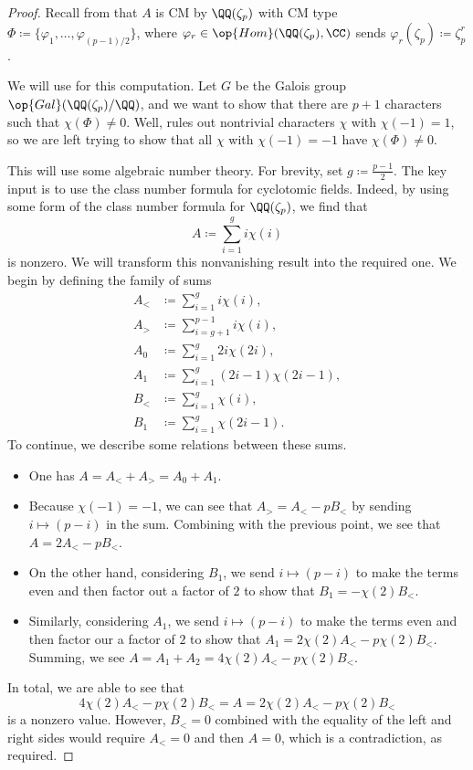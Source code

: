\documentclass{article}
\begin{document}
\begin{proof}
	Recall from  that $A$ is CM by $\QQ(\zeta_p)$ with CM type $\Phi\coloneqq\{\varphi_1,\ldots,\varphi_{(p-1)/2}\}$, where $\varphi_r\in\op{Hom}(\QQ(\zeta_p),\CC)$ sends $\varphi_r(\zeta_p)\coloneqq\zeta_p^r$.
	
	We will use  for this computation. Let $G$ be the Galois group $\op{Gal}(\QQ(\zeta_p)/\QQ)$, and we want to show that there are $p+1$ characters such that $\chi(\Phi)\ne0$. Well,  rules out nontrivial characters $\chi$ with $\chi(-1)=1$, so we are left trying to show that all $\chi$ with $\chi(-1)=-1$ have $\chi(\Phi)\ne0$.

	This will use some algebraic number theory. For brevity, set $g\coloneqq\frac{p-1}2$. The key input is to use the class number formula for cyclotomic fields. Indeed, by using some form of the class number formula for $\QQ(\zeta_p)$, we find that
	\[A\coloneqq\sum_{i=1}^gi\chi(i)\]
	is nonzero. We will transform this nonvanishing result into the required one. We begin by defining the family of sums
	\begin{align*}
		A_< &\coloneqq \sum_{i=1}^gi\chi(i), \\
		A_> &\coloneqq \sum_{i=g+1}^{p-1}i\chi(i), \\
		A_0 &\coloneqq \sum_{i=1}^g2i\chi(2i), \\
		A_1 &\coloneqq \sum_{i=1}^g(2i-1)\chi(2i-1), \\
		B_< &\coloneqq \sum_{i=1}^g\chi(i), \\
		B_1 &\coloneqq \sum_{i=1}^g\chi(2i-1).
	\end{align*}
	To continue, we describe some relations between these sums.
	\begin{itemize}
		\item One has $A=A_<+A_>=A_0+A_1$.
		\item Because $\chi(-1)=-1$, we can see that $A_>=A_<-pB_<$ by sending $i\mapsto(p-i)$ in the sum. Combining with the previous point, we see that $A=2A_<-pB_<$.
		\item On the other hand, considering $B_1$, we send $i\mapsto(p-i)$ to make the terms even and then factor out a factor of $2$ to show that $B_1=-\chi(2)B_<$.
		\item Similarly, considering $A_1$, we send $i\mapsto(p-i)$ to make the terms even and then factor our a factor of $2$ to show that $A_1=2\chi(2)A_<-p\chi(2)B_<$. Summing, we see $A=A_1+A_2=4\chi(2)A_<-p\chi(2)B_<$.
	\end{itemize}
	In total, we are able to see that
	\[4\chi(2)A_<-p\chi(2)B_<=A=2\chi(2)A_<-p\chi(2)B_<\]
	is a nonzero value. However, $B_<=0$ combined with the equality of the left and right sides would require $A_<=0$ and then $A=0$, which is a contradiction, as required.
\end{proof}

\end{document}
